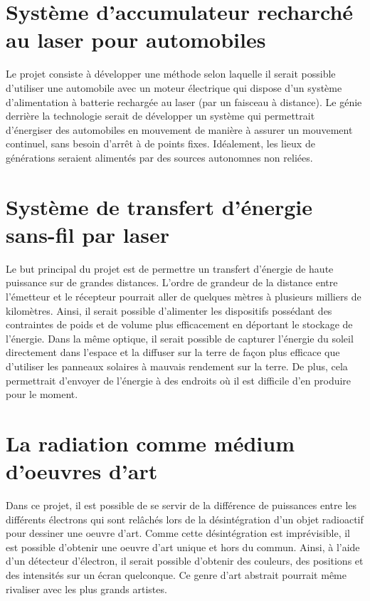 \section{Système d'accumulateur recharché au laser pour automobiles}
Le projet consiste à développer une méthode selon laquelle il serait possible d'utiliser une automobile avec un moteur électrique qui dispose d'un système d'alimentation à batterie rechargée au laser (par un faisceau à distance). Le génie derrière la technologie serait de développer un système qui permettrait d'énergiser des automobiles en mouvement de manière à assurer un mouvement continuel, sans besoin d'arrêt à de points fixes. Idéalement, les lieux de générations seraient alimentés par des sources autonomnes non reliées. 

\section{Système de transfert d'énergie sans-fil par laser}
Le but principal du projet est de permettre un transfert d'énergie de haute puissance sur de grandes distances. L'ordre de grandeur de la distance entre l'émetteur et le récepteur pourrait aller de quelques mètres à plusieurs milliers de kilomètres. Ainsi, il serait possible d'alimenter les dispositifs possédant des contraintes de poids et de volume plus efficacement en déportant le stockage de l'énergie. Dans la même optique, il serait possible de capturer l'énergie du soleil directement dans l'espace et la diffuser sur la terre de façon plus efficace que d'utiliser les panneaux solaires à mauvais rendement sur la terre. De plus, cela permettrait d'envoyer de l'énergie à des endroits où il est difficile d'en produire pour le moment.

\section{La radiation comme médium d'oeuvres d'art}
Dans ce projet, il est possible de se servir de la différence de puissances entre les différents électrons qui sont relâchés lors de la désintégration d'un objet radioactif pour dessiner une oeuvre d'art. Comme cette désintégration est imprévisible, il est possible d'obtenir une oeuvre d'art unique et hors du commun. Ainsi, à l'aide d'un détecteur d'électron, il serait possible d'obtenir des couleurs, des positions et des intensités sur un écran quelconque. Ce genre d'art abstrait pourrait même rivaliser avec les plus grands artistes.